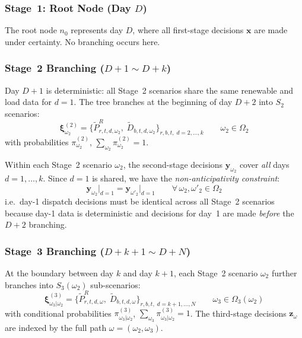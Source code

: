 \documentclass[11pt]{article}
\begin{document}
\subsubsection{Stage~1: Root Node (Day $D$)}

The root node $n_0$ represents day $D$, where all first-stage decisions
$\mathbf{x}$ are made under certainty. No branching occurs here.

\subsubsection{Stage~2 Branching ($D{+}1 \sim D{+}k$)}

Day $D{+}1$ is deterministic: all Stage~2 scenarios share the same
renewable and load data for $d = 1$. The tree branches at the beginning
of day $D{+}2$ into $S_2$ scenarios:
\begin{equation}\label{eq:xi2}
  \boldsymbol{\xi}^{(2)}_{\omega_2} =
  \bigl\{
    \tilde{P}^{R}_{r,t,d,\omega_2},\;
    \tilde{D}_{b,t,d,\omega_2}
  \bigr\}_{r,b,t,\; d = 2,\ldots,k}
  \qquad \omega_2 \in \Omega_2
\end{equation}
with probabilities $\pi^{(2)}_{\omega_2}$,
$\sum_{\omega_2} \pi^{(2)}_{\omega_2} = 1$.

Within each Stage~2 scenario $\omega_2$, the second-stage decisions
$\mathbf{y}_{\omega_2}$ cover \emph{all} days $d = 1, \ldots, k$.
Since $d = 1$ is shared, we have the \emph{non-anticipativity
constraint}:
\begin{equation}\label{eq:nonantic-s2}
  \mathbf{y}_{\omega_2}\big|_{d=1}
  = \mathbf{y}_{\omega'_2}\big|_{d=1}
  \qquad \forall\, \omega_2, \omega'_2 \in \Omega_2
\end{equation}
i.e.\ day-1 dispatch decisions must be identical across all Stage~2
scenarios because day-1 data is deterministic and decisions for day~1
are made \emph{before} the $D{+}2$ branching.

\subsubsection{Stage~3 Branching ($D{+}k{+}1 \sim D{+}N$)}

At the boundary between day $k$ and day $k{+}1$, each Stage~2 scenario
$\omega_2$ further branches into $S_3(\omega_2)$ sub-scenarios:
\begin{equation}\label{eq:xi3}
  \boldsymbol{\xi}^{(3)}_{\omega_3|\omega_2} =
  \bigl\{
    \tilde{P}^{R}_{r,t,d,\omega},\;
    \tilde{D}_{b,t,d,\omega}
  \bigr\}_{r,b,t,\; d = k+1,\ldots,N}
  \qquad \omega_3 \in \Omega_3(\omega_2)
\end{equation}
with conditional probabilities $\pi^{(3)}_{\omega_3|\omega_2}$,
$\sum_{\omega_3} \pi^{(3)}_{\omega_3|\omega_2} = 1$.
The third-stage decisions $\mathbf{z}_{\omega}$ are indexed by the
full path $\omega = (\omega_2, \omega_3)$.
\end{document}
